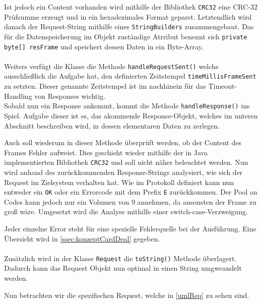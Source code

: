 Ist jedoch ein Content vorhanden wird mithilfe der Bibliothek \lstinline{CRC32} eine CRC-32 Prüfsumme erzeugt und in ein hexadezimales Format geparst.
Letztendlich wird danach der Request-String mithilfe eines \lstinline{StringBuilders} zusammengebaut.
Das für die Datenspeicherung im Objekt zuständige Atrribut benennt sich \lstinline[style=java]{private byte[] resFrame} und speichert dessen Daten in ein Byte-Array.\\\\
Weiters verfügt die Klasse die Methode \lstinline[style=java]{handleRequestSent()} welche ausschließlich die Aufgabe hat, den definierten Zeitstempel \lstinline[style=java]{timeMillisFrameSent} zu setzten.
Dieser genannte Zeitstempel ist im nachhinein für das Timeout-Handling von Responses wichtig.\\
Sobald nun ein Response ankommt, kommt die Methode \lstinline[style=java]{handleResponse()} ins Spiel.
Aufgabe dieser ist es, das akommende Response-Objekt, welches im unteren Abschnitt beschreiben wird, in dessen elementaren Daten zu zerlegen.

Auch soll wiederum in dieser Methode überprüft werden, ob der Content des Frames Fehler aufweist. Dies geschieht wieder mithilfe der in Java implementierten Bibliothek \lstinline{CRC32} und soll nicht näher beleuchtet werden.
Nun wird anhand des zurückkommenden Response-Strings analysiert, wie sich der Request im Zielsystem verhalten hat.
Wie im Protokoll definiert kann nun entweder ein \lstinline[style=java]{OK} oder ein Errorcode mit dem Prefix \lstinline[style=java]{E} zurückkommen.
Der Pool an Codes kann jedoch nur ein Volumen von 9 annehmen, da ansonsten der Frame zu groß wäre.
Umgesetzt wird die Analyse mithilfe einer switch-case-Verzweigung.

Jeder einzelne Error steht für eine spezielle Fehlerquelle bei der Ausführung.
Eine Übersicht wird in \autoref{ssec:konzeptCardDeal} gegeben.\\\\
Zusätzlich wird in der Klasse \lstinline[style=java]{Request} die \lstinline[style=java]{toString()} Methode überlagert.
Dadurch kann das Request Objekt nun optimal in einen String umgweandelt werden.

Nun betrachten wir die spezifischen Request, welche in \autoref{umlReq} zu sehen sind.\\
